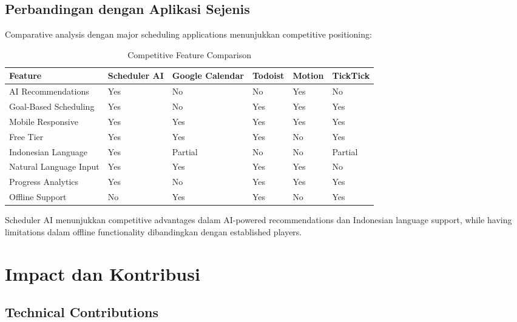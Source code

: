 \subsection{Perbandingan dengan Aplikasi Sejenis}

Comparative analysis dengan major scheduling applications menunjukkan competitive positioning:

\begin{table}[ht]
\centering
\caption{Competitive Feature Comparison}
\label{tab:competitive-comparison}
\footnotesize
\begin{adjustbox}{width=\textwidth,center}
\begin{tabular}{@{}p{3cm}p{2cm}p{2cm}p{2cm}p{2cm}p{2cm}@{}}
\toprule
\textbf{Feature} & \textbf{Scheduler AI} & \textbf{Google Calendar} & \textbf{Todoist} & \textbf{Motion} & \textbf{TickTick} \\
\midrule
AI Recommendations & Yes & No & No & Yes & No \\
\hline
Goal-Based Scheduling & Yes & No & Yes & Yes & Yes \\
\hline
Mobile Responsive & Yes & Yes & Yes & Yes & Yes \\
\hline
Free Tier & Yes & Yes & Yes & No & Yes \\
\hline
Indonesian Language & Yes & Partial & No & No & Partial \\
\hline
Natural Language Input & Yes & Yes & Yes & Yes & No \\
\hline
Progress Analytics & Yes & No & Yes & Yes & Yes \\
\hline
Offline Support & No & Yes & Yes & No & Yes \\
\bottomrule
\end{tabular}
\end{adjustbox}
\end{table}

Scheduler AI menunjukkan competitive advantages dalam AI-powered recommendations dan Indonesian language support, while having limitations dalam offline functionality dibandingkan dengan established players.

\section{Impact dan Kontribusi}

\subsection{Technical Contributions}

